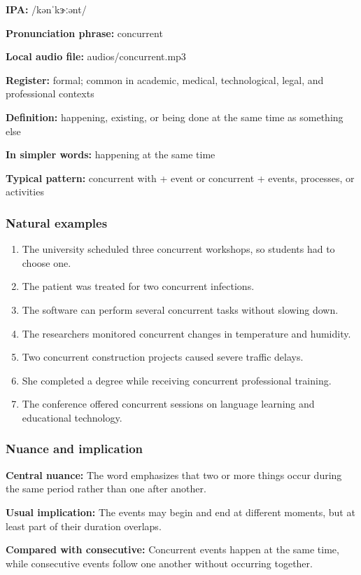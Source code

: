 \documentclass[11pt]{article}
\begin{document}
\textbf{IPA:} /kənˈkɝːənt/

\textbf{Pronunciation phrase:} concurrent

\textbf{Local audio file:} audios/concurrent.mp3

\textbf{Register:} formal; common in academic, medical, technological, legal, and professional contexts

\textbf{Definition:} happening, existing, or being done at the same time as something else

\textbf{In simpler words:} happening at the same time

\textbf{Typical pattern:} concurrent with + event or concurrent + events, processes, or activities

\subsubsection{Natural examples}
\begin{enumerate}
  \item The university scheduled three concurrent workshops, so students had to choose one.
  \item The patient was treated for two concurrent infections.
  \item The software can perform several concurrent tasks without slowing down.
  \item The researchers monitored concurrent changes in temperature and humidity.
  \item Two concurrent construction projects caused severe traffic delays.
  \item She completed a degree while receiving concurrent professional training.
  \item The conference offered concurrent sessions on language learning and educational technology.
\end{enumerate}

\subsubsection{Nuance and implication}
\textbf{Central nuance:} The word emphasizes that two or more things occur during the same period rather than one after another.

\textbf{Usual implication:} The events may begin and end at different moments, but at least part of their duration overlaps.

\textbf{Compared with consecutive:} Concurrent events happen at the same time, while consecutive events follow one another without occurring together.
\end{document}
